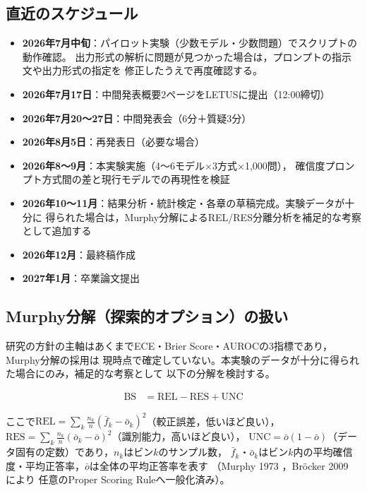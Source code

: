 \documentclass[11pt,a4paper,oneside]{article}
\begin{document}
\subsection{直近のスケジュール}

\begin{itemize}
  \item \textbf{2026年7月中旬}：パイロット実験（少数モデル・少数問題）でスクリプトの動作確認。
        出力形式の解析に問題が見つかった場合は，プロンプトの指示文や出力形式の指定を
        修正したうえで再度確認する。
  \item \textbf{2026年7月17日}：中間発表概要2ページをLETUSに提出（12:00締切）
  \item \textbf{2026年7月20〜27日}：中間発表会（6分＋質疑3分）
  \item \textbf{2026年8月5日}：再発表日（必要な場合）
  \item \textbf{2026年8〜9月}：本実験実施（4〜6モデル×3方式×1,000問），
        確信度プロンプト方式間の差と現行モデルでの再現性を検証
  \item \textbf{2026年10〜11月}：結果分析・統計検定・各章の草稿完成。実験データが十分に
        得られた場合は，Murphy分解によるREL/RES分離分析を補足的な考察として追加する
  \item \textbf{2026年12月}：最終稿作成
  \item \textbf{2027年1月}：卒業論文提出
\end{itemize}

\subsection{Murphy分解（探索的オプション）の扱い}

研究の方針の主軸はあくまでECE・Brier Score・AUROCの3指標であり，Murphy分解の採用は
現時点で確定していない。本実験のデータが十分に得られた場合にのみ，補足的な考察として
以下の分解を検討する。

\begin{align}
  \text{BS} &= \text{REL} - \text{RES} + \text{UNC}
\end{align}

ここで$\text{REL} = \sum_k \frac{n_k}{n}(\bar{f}_k - \bar{o}_k)^2$（較正誤差，低いほど良い），
$\text{RES} = \sum_k \frac{n_k}{n}(\bar{o}_k - \bar{o})^2$（識別能力，高いほど良い），
$\text{UNC} = \bar{o}(1-\bar{o})$（データ固有の定数）であり，$n_k$はビン$k$のサンプル数，
$\bar{f}_k$・$\bar{o}_k$はビン$k$内の平均確信度・平均正答率，$\bar{o}$は全体の平均正答率を表す
（Murphy 1973 \cite{murphy1973vector}，Bröcker 2009 \cite{brocker2009reliability} により
任意のProper Scoring Ruleへ一般化済み）。
\end{document}

